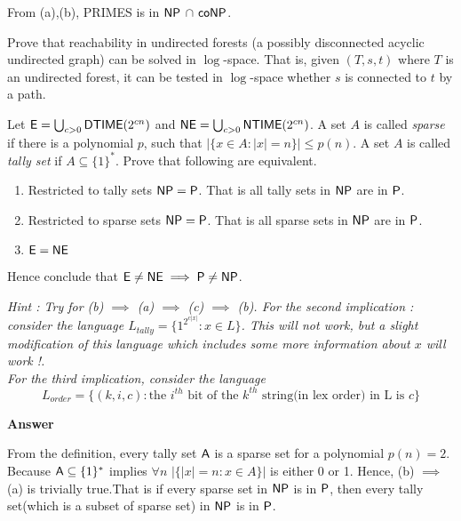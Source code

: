 \documentclass[addpoints,12pt]{exam}
\begin{document}
\begin{questions}
From (a),(b), PRIMES is in $\NP$ $\cap$ $\co\NP$.

\question[10] Prove that reachability in undirected forests (a possibly disconnected acyclic undirected graph) can be solved in $\log$-space. That is, given $(T,s,t)$ where $T$ is an undirected forest, it can be tested in $\log$-space whether $s$ is connected to $t$ by a path.

\question[18]
Let $\E = \bigcup_{c > 0} \DTIME(2^{cn})$ and $\NE = \bigcup_{c > 0} \NTIME(2^{cn})$. A set $A$ is called {\em sparse} if there is a polynomial $p$,
    such that $|\{ x \in A : |x| = n \}| \le p(n)$. A set $A$ is called
    {\em tally set} if $A \subseteq \{1\}^*$.  Prove that following
    are equivalent.
  \begin{enumerate}
  \item Restricted to tally sets $\NP = \P$. That is all tally sets in $\NP$ are in $\P$.
  \item Restricted to sparse sets $\NP = \P$. That is all sparse sets
    in $\NP$ are in $\P$.
  \item $\E = \NE$
  \end{enumerate}
  Hence conclude that $\E \ne \NE \implies \P \ne \NP$.
  
  \emph{Hint : Try for (b) $\implies$ (a) $\implies$ (c) $\implies$ (b). 
  For the second implication : consider the language $L_{tally} = \{1^{2^{c|x|}} : x \in L\}$.
  This will not work, but a slight modification of this language which includes some more information about 
  $x$ will work !. \\ For the third implication, consider the language 
\[ L_{order} = \{(k,i,c): \textrm{the $i^{th}$ bit of the $k^{th}$ string(in lex order) in L is $c$} \} \] }


\textbf{Answer}\newline

From the definition, every tally set $\A$ is a sparse set for a polynomial $p(n)=2$. Because $\A \subseteq \{1\}^{\ast}$ implies $\forall n$ $|\{|x|=n:x \in A\}|$ is either 0 or 1.\newline
Hence, (b) $\implies$ (a) is trivially true.That is if every sparse set in $\NP$ is in $\P$, then every tally set(which is a subset of sparse set) in $\NP$ is in $\P$.	



\end{questions}
\end{document}
